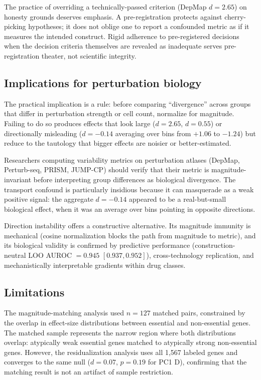 \documentclass[11pt]{article}
\begin{document}
The practice of overriding a technically-passed criterion (DepMap $d =
2.65$) on honesty grounds deserves emphasis. A pre-registration
protects against cherry-picking hypotheses; it does not oblige one to
report a confounded metric as if it measures the intended construct.
Rigid adherence to pre-registered decisions when the decision criteria
themselves are revealed as inadequate serves pre-registration theater,
not scientific integrity.

\subsection{Implications for perturbation biology}

The practical implication is a rule: before comparing ``divergence''
across groups that differ in perturbation strength or cell count,
normalize for magnitude. Failing to do so produces effects that look
large ($d = 2.65$, $d = 0.55$) or directionally misleading ($d = -0.14$
averaging over bins from $+1.06$ to $-1.24$) but reduce to the
tautology that bigger effects are noisier or better-estimated.

Researchers computing variability metrics on perturbation atlases
(DepMap, Perturb-seq, PRISM, JUMP-CP) should verify that their metric is
magnitude-invariant before interpreting group differences as biological
divergence. The transport confound is particularly insidious because it
can masquerade as a weak positive signal: the aggregate $d = -0.14$
appeared to be a real-but-small biological effect, when it was an
average over bins pointing in opposite directions.

Direction instability offers a constructive alternative. Its magnitude
immunity is mechanical (cosine normalization blocks the path from
magnitude to metric), and its biological validity is confirmed by
predictive performance (construction-neutral LOO AUROC $= 0.945$
$[0.937, 0.952]$), cross-technology replication, and mechanistically
interpretable gradients within drug classes.

\subsection{Limitations}

The magnitude-matching analysis used $n = 127$ matched pairs,
constrained by the overlap in effect-size distributions between
essential and non-essential genes. The matched sample represents the
narrow region where both distributions overlap: atypically weak essential
genes matched to atypically strong non-essential genes. However, the
residualization analysis uses all 1{,}567 labeled genes and converges to
the same null ($d = 0.07$, $p = 0.19$ for PC1 D), confirming that the
matching result is not an artifact of sample restriction.
\end{document}
